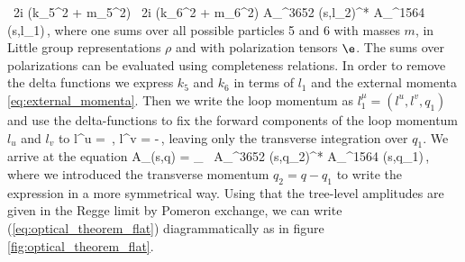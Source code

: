 	\int \!  \, 2\pi i \de(k_5^2 + m_5^2) \, 2\pi i \de(k_6^2 + m_6^2) 
	A_^{3652} (s,l_2)^*
	A_^{1564} (s,l_1)\,,
	\label{eq:optical_theorem_start}
	\eeq
where one sums over all possible particles 5 and 6 with masses $m$, in Little group representations $\rho$ and with 
polarization tensors $\e$. The sums over polarizations can be evaluated using completeness relations.
In order to remove the delta functions we express $k_5$ and $k_6$ in terms of $l_1$ and the external momenta \eqref{eq:external_momenta}.
Then we write the loop momentum as $l_1^\mu = (l^u,l^v,q_1)$
and use the delta-functions to fix the forward components of the loop momentum $l_u$ and $l_v$ to
\bea
l^u = \,,
		    \qquad\qquad
l^v = -\,,
leaving only the transverse integration over $q_1$.
We arrive at the equation
	\beq
		\Im A_{}(s,q) = \sum\limits_{}
		\int {}  \, 
		A_^{3652} (s,q_2)^*
		A_^{1564} (s,q_1)\,,
		\label{eq:optical_theorem_flat}
	\eeq
where we introduced the transverse momentum $q_2=q-q_1$  to write the expression 
in a more symmetrical way. 	
Using that the tree-level amplitudes are given 
in the Regge limit by Pomeron exchange, we can write (\ref{eq:optical_theorem_flat}) diagrammatically as in figure \ref{fig:optical_theorem_flat}.
